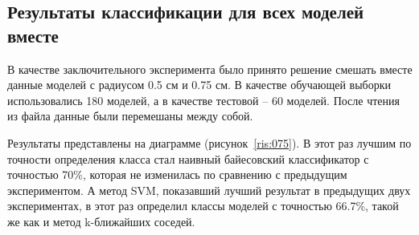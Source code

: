\subsection{Результаты классификации для всех моделей вместе}
В качестве заключительного эксперимента было принято решение смешать вместе данные моделей с радиусом 0.5 см и 0.75 см. В качестве обучающей выборки использовались 180 моделей, а в качестве тестовой -- 60 моделей. После чтения из файла данные были перемешаны между собой. 
\par
Результаты представлены на диаграмме (рисунок~\ref{ris:075}). В этот раз лучшим по точности определения класса стал наивный байесовский классификатор с точностью 70\%, которая не изменилась по сравнению с предыдущим экспериментом. А метод  SVM, показавший лучший результат в предыдущих двух экспериментах, в этот раз определил классы моделей с точностью 66.7\%, такой же как и метод k-ближайших соседей.

